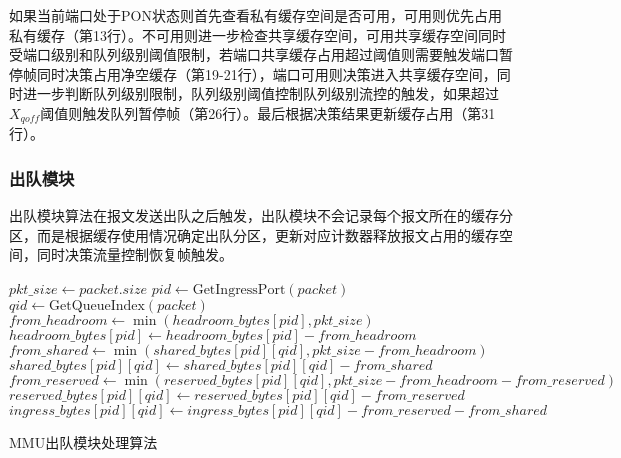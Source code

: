 如果当前端口处于PON状态则首先查看私有缓存空间是否可用，可用则优先占用私有缓存（第13行）。不可用则进一步检查共享缓存空间，可用共享缓存空间同时受端口级别和队列级别阈值限制，若端口共享缓存占用超过阈值则需要触发端口暂停帧同时决策占用净空缓存（第19-21行），端口可用则决策进入共享缓存空间，同时进一步判断队列级别限制，队列级别阈值控制队列级别流控的触发，如果超过$X_{\mathit{qoff}}$阈值则触发队列暂停帧（第26行）。最后根据决策结果更新缓存占用（第31行）。

\subsubsection{出队模块}
出队模块算法在报文发送出队之后触发，出队模块不会记录每个报文所在的缓存分区，而是根据缓存使用情况确定出队分区，更新对应计数器释放报文占用的缓存空间，同时决策流量控制恢复帧触发。

\begin{algorithm}[H]
  \small
  \SetAlCapFnt{\small}
  \SetAlCapNameFnt{\small}

  \SetAlgoVlined

  $pkt\_size \leftarrow packet.size$\;
  $pid \leftarrow \text{GetIngressPort}(packet)$\;
  $qid \leftarrow \text{GetQueueIndex}(packet)$\;
  $from\_headroom \leftarrow \min(headroom\_bytes[pid], pkt\_size)$\;
  $headroom\_bytes[pid] \leftarrow headroom\_bytes[pid] - from\_headroom$\;
  $from\_shared \leftarrow \min(shared\_bytes[pid][qid], pkt\_size-from\_headroom)$\;
  $shared\_bytes[pid][qid] \leftarrow shared\_bytes[pid][qid] - from\_shared$\;
  $from\_reserved \leftarrow \min(reserved\_bytes[pid][qid], pkt\_size-from\_headroom-from\_reserved)$\;
  $reserved\_bytes[pid][qid] \leftarrow reserved\_bytes[pid][qid] - from\_reserved$\;
  $ingress\_bytes[pid][qid] \leftarrow ingress\_bytes[pid][qid] - from\_reserved - from\_shared$\;

  \caption{MMU出队模块处理算法}
  \label{alg:c3:s5:ss5:dequeue module algorithm}
\end{algorithm}

